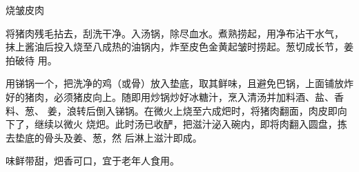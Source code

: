 \begin{recipe}{烧皱皮肉}

\ingredients


\preparation

\step 将猪肉残毛拈去，刮洗干净。入汤锅，除尽血水。煮熟捞起，用净布沾干水气，
抹上酱油后投入烧至八成热的油锅内，炸至皮色金黄起皱时捞起。葱切成长节，姜拍破待
用。

\step 用锑锅一个，把洗净的鸡（或骨）放入垫底，取其鲜味，且避免巴锅，上面铺放炸
好的猪肉，必须猪皮向上。随即用炒锅炒好冰糖汁，烹入清汤并加料酒、盐、香料、葱、
姜，浪转后倒入锑锅。在微火上烧至六成𤆵时，将猪肉翻面，肉皮即向下了，继续以微火
烧𤆵。此时汤已收酽，把滋汁泌入碗内，即将肉翻入圆盘，拣去垫底的骨头及姜、葱，然
后淋上滋汁即成。

\features

味鲜带甜，𤆵香可口，宜于老年人食用。

\end{recipe}

